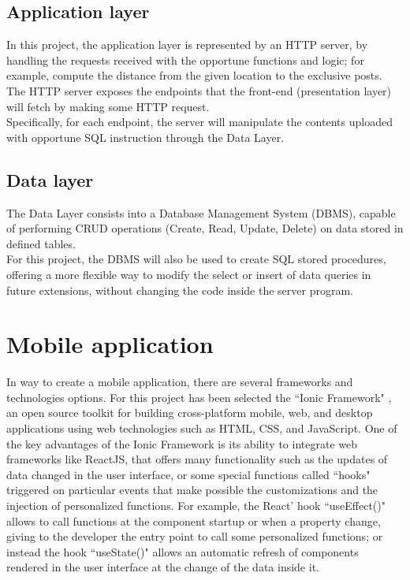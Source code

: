 \documentclass[conference]{IEEEtran}
\begin{document}
\subsection{Application layer}

In this project, the application layer is represented by an HTTP server, by handling the requests received with the opportune functions and logic; for example, compute the distance from the given location to the exclusive posts.
The HTTP server exposes the endpoints that the front-end (presentation layer) will fetch by making some HTTP request.
\\
Specifically, for each endpoint, the server will manipulate the contents uploaded with opportune SQL instruction through the Data Layer.

\subsection{Data layer}

The Data Layer consists into a Database Management System (DBMS), capable of performing CRUD operations (Create, Read, Update, Delete) on data stored in defined tables.
\\
For this project, the DBMS will also be used to create SQL stored procedures, offering a more flexible way to modify the select or insert of data queries in future extensions, without changing the code inside the server program.


\section{Mobile application}
In way to create a mobile application, there are several frameworks and technologies options. For this project has been selected the ``Ionic Framework" \cite{b1}, an open source toolkit for building cross-platform mobile, web, and desktop applications using web technologies such as HTML, CSS, and JavaScript.
One of the key advantages of the Ionic Framework is its ability to integrate web frameworks like ReactJS, that offers many functionality such as the updates of data changed in the user interface, or some special functions called ``hooks" triggered on particular events that make possible the customizations and the injection of personalized functions.
For example, the React' hook ``useEffect()" allows to call functions at the component startup or when a property change, giving to the developer the entry point to call some personalized functions; or instead the hook ``useState()" allows an automatic refresh of components rendered in the user interface at the change of the data inside it.
\end{document}
